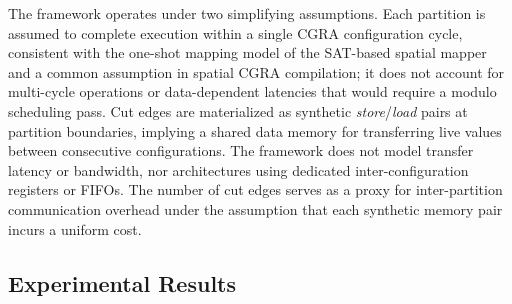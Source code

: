 \documentclass[runningheads]{llncs}
\begin{document}
The framework operates under two simplifying assumptions. Each partition is assumed to complete execution within a single CGRA configuration cycle, consistent with the one-shot mapping model of the SAT-based spatial mapper and a common assumption in spatial CGRA compilation; it does not account for multi-cycle operations or data-dependent latencies that would require a modulo scheduling pass. Cut edges are materialized as synthetic \textit{store}/\textit{load} pairs at partition boundaries, implying a shared data memory for transferring live values between consecutive configurations. The framework does not model transfer latency or bandwidth, nor architectures using dedicated inter-configuration registers or FIFOs. The number of cut edges serves as a proxy for inter-partition communication overhead under the assumption that each synthetic memory pair incurs a uniform cost.
\clearpage
\subsection{Experimental Results}
%

\begin{table}[h]
\centering
\caption{Benchmark results on the 150-graph evaluation set. $\dagger$ Greedy results are reported on its 23 successes only and are not directly comparable.}
\label{tab:benchmark_results}
\end{table}
\end{document}
